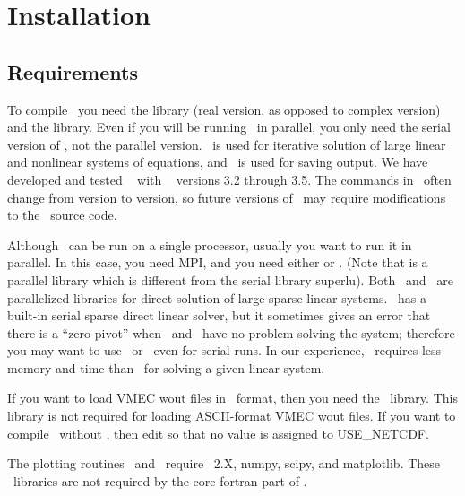 \chapter{Installation}


\section{Requirements}
\label{sec:requirements}

To compile \sfincs~you need the \href{http://www.mcs.anl.gov/petsc/}{\PETSc} library (real version, as opposed to complex version) 
and the \href{https://www.hdfgroup.org/HDF5/}{\HDF} library.  Even if you will be running \sfincs~in parallel, you
only need the serial version of \HDF, not the parallel version.
\PETSc~is used for iterative solution of large linear and nonlinear systems of equations, and \HDF~is used for saving output.
We have developed and tested \sfincs~ with \PETSc~
versions 3.2 through 3.5.  The commands in \PETSc~often change from version to version, so future versions of \PETSc~may require modifications
to the \sfincs~source code.

Although \sfincs~can be run on a single processor, usually you want to run it in parallel.  
In this case, you need {\ttfamily MPI}, and you need either \href{http://mumps-solver.org/}{\mumps}
or \href{http://crd-legacy.lbl.gov/~xiaoye/SuperLU/}{\superludist}.  (Note that \superludist is a parallel library which is different from the serial library {\ttfamily superlu}).
Both \mumps~and \superludist~are parallelized libraries for direct solution of large sparse linear systems. 
\PETSc~has a built-in serial sparse direct linear solver,
but it sometimes gives an error that there is a ``zero pivot'' when \mumps~and \superludist~have no problem solving the system;
therefore you may want to use \mumps~or \superludist~even for serial runs.  In our experience,
\mumps~requires less memory and time than \superludist~for solving a given linear system.

If you want to load {\ttfamily VMEC wout} files in \netCDF~format, then you need the \netCDF~library.
This library is not required for loading ASCII-format {\ttfamily VMEC wout} files.  If you want to compile \sfincs~without
\netCDF, then edit  so that no value is assigned to {\ttfamily USE\_NETCDF}.

The plotting routines \sfincsPlot~and \sfincsScanPlot~require \python~2.X, {\ttfamily numpy}, {\ttfamily scipy}, and {\ttfamily matplotlib}.
These \python~libraries are not required by the core fortran part of \sfincs.

